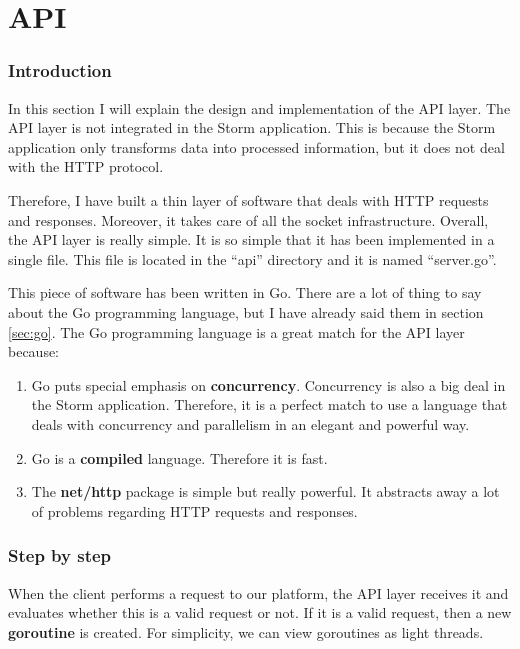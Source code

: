  
\section{API}
\label{sec:implementation_api}

\subsubsection*{Introduction}

In this section I will explain the design and implementation of the API layer.
The API layer is not integrated in the Storm application. This is because the
Storm application only transforms data into processed information, but it does
not deal with the HTTP protocol.

Therefore, I have built a thin layer of software that deals with HTTP requests
and responses. Moreover, it takes care of all the socket infrastructure.
Overall, the API layer is really simple. It is so simple that it has been
implemented in a single file. This file is located in the ``api'' directory and
it is named ``server.go''.

This piece of software has been written in Go. There are a lot of thing to say
about the Go programming language, but I have already said them in section
\ref{sec:go}. The Go programming language is a great match for the API layer
because:

\begin{enumerate}
  \item Go puts special emphasis on {\bf concurrency}. Concurrency is also a
big deal in the Storm application. Therefore, it is a perfect match to use a
language that deals with concurrency and parallelism in an elegant and powerful
way.
  \item Go is a {\bf compiled} language. Therefore it is fast.
  \item The {\bf net/http} package is simple but really powerful. It abstracts
away a lot of problems regarding HTTP requests and responses.
\end{enumerate}

\subsubsection*{Step by step}

When the client performs a request to our platform, the API layer receives it
and evaluates whether this is a valid request or not. If it is a valid request,
then a new {\bf goroutine} is created. For simplicity, we can view
goroutines as light threads.

